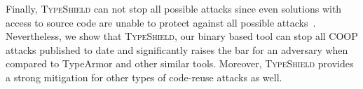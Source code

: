 Finally, \textsc{TypeShield} can not stop all possible attacks since even solutions 
with access to source code are unable to protect against all possible attacks~\cite{carlini:bending}.
Nevertheless, we show that \textsc{TypeShield}, our binary based tool can stop all 
COOP attacks published to date and significantly raises the bar for an adversary when compared to
TypeArmor and other similar tools. Moreover, \textsc{TypeShield} provides a strong mitigation 
for other types of code-reuse attacks as well.
